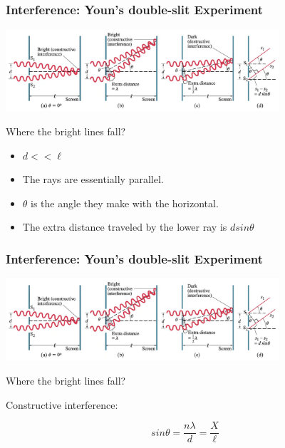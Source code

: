 \documentclass[]{beamer}
\begin{document}
\begin{frame}

\frametitle{Interference: Youn's double-slit Experiment}

  \begin{center}
  \includegraphics[height=1.2in]{images5/doubleslit2.jpg}
\end{center}

\pause
Where the bright lines fall?
\pause

\begin{itemize}
\item $d<<\ell$

\pause

\item The rays are essentially parallel.

\pause

\item $\theta$ is the angle they make with the horizontal.

\pause

\item The extra distance traveled by the lower ray is $d sin\theta$
\end{itemize}

  \end{frame}






\begin{frame}

\frametitle{Interference: Youn's double-slit Experiment}

  \begin{center}
  \includegraphics[height=1.2in]{images5/doubleslit2.jpg}
\end{center}

\pause
Where the bright lines fall?
\pause
\vspace{3mm}

Constructive interference:
\pause
\vspace{3mm}

\begin{equation}
 sin\theta=\frac{n\lambda}{d}=\frac{X}{\ell}
\end{equation}


  \end{frame}
\end{document}
